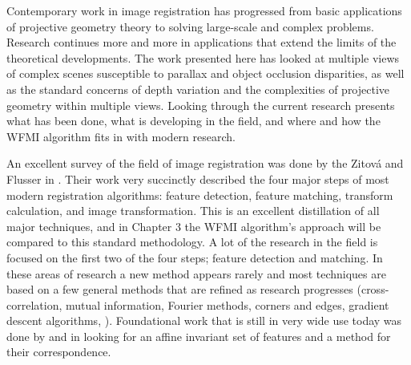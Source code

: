 %
%
%
%
%
%
%
%
%

%
%
%



Contemporary work in image registration has progressed from basic applications of projective geometry theory to solving large-scale and complex problems. Research continues more and more in applications that extend the limits of the theoretical developments. The work presented here has looked at multiple views of complex scenes susceptible to parallax and object occlusion disparities, as well as the standard concerns of depth variation and the complexities of projective geometry within multiple views. Looking through the current research presents what has been done, what is developing in the field, and where and how the WFMI algorithm fits in with modern research.

 An excellent survey of the field of image registration was done by the Zitov{\'a} and Flusser in \cite{Zitova2003}. Their work very succinctly described the four major steps of most modern registration algorithms: feature detection, feature matching, transform calculation, and image transformation. This is an excellent distillation of all major techniques, and in Chapter 3 the WFMI algorithm's approach will be compared to this standard methodology. A lot of the research in the field is focused on the first two of the four steps; feature detection and matching. In these areas of research a new method appears rarely and most techniques are based on a few general methods that are refined as research progresses (cross-correlation, mutual information, Fourier methods, corners and edges, gradient descent algorithms, \etc). Foundational work that is still in very wide use today was done by \cite{Brown2003} and \cite{Brown2005} in looking for an affine invariant set of features and a method for their correspondence.
 

